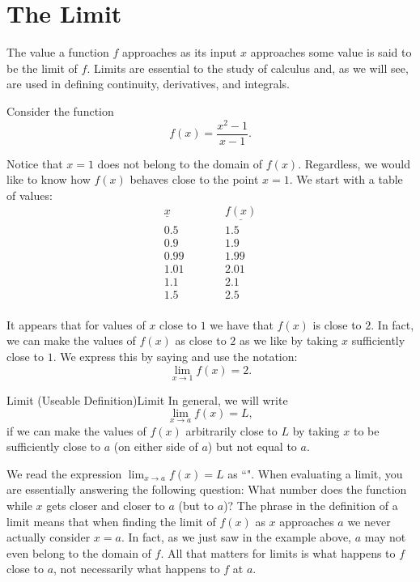 \section{The Limit}\label{sec:LimitsWorkingDefn}
The value a function $f$ approaches as its input $x$ approaches some value is said to be the limit of $f$. Limits are essential to the study of calculus and, as we will see, are used in defining continuity, derivatives, and integrals.

Consider the function
$$f(x)=\frac{x^2-1}{x-1}.$$

Notice that $x=1$ does not belong to the domain of $f(x)$.
Regardless, we would like to know how $f(x)$ behaves close to the point $x=1$.
We start with a table of values:
$$\begin{array}{ccc}
\underline{x}&\qquad&\underline{f(x)}\\
0.5&\qquad&1.5\\
0.9&\qquad&1.9\\
0.99&\qquad&1.99\\
1.01&\qquad&2.01\\
1.1&\qquad&2.1\\
1.5&\qquad&2.5\\
\end{array}$$

It appears that for values of $x$ close to $1$ we have that $f(x)$ is close to $2$.
In fact, we can make the values of $f(x)$ as close to $2$ as we like by taking $x$ sufficiently close to $1$.
We express this by saying  and use the notation:
$$\lim_{x\to 1}f(x)=2.$$
\begin{definition}{Limit (Useable Definition)}{Limit}
In general, we will write
$$\lim_{x\to a}f(x)=L,$$
if we can make the values of $f(x)$ arbitrarily close to $L$ by taking $x$ to be sufficiently close to $a$ (on either side of $a$) but not equal to $a$.
\end{definition}

We read the expression $\lim_{x\to a}f(x)=L$ as ``".
When evaluating a limit, you are essentially answering the following question: 
What number does the function  while $x$ gets closer and closer to $a$ (but  to $a$)?
The phrase  in the definition of a limit means 
that when finding the limit of $f(x)$ as $x$ approaches $a$ we never actually consider $x=a$.
In fact, as we just saw in the example above, $a$ may not even belong to the domain of $f$.
All that matters for limits is what happens to $f$ close to $a$, not necessarily what happens to $f$ at $a$.

